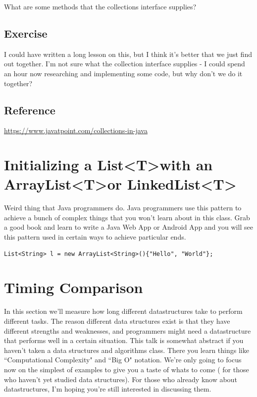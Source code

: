 \documentclass[12pt]{article}
\begin{document}
What are some methods that the  collections interface supplies?

\subsection{Exercise}
I could have written a long lesson on this, but I think it's better that we just find out together. I'm not sure what the collection interface supplies - I could spend an hour now researching and implementing some code, but why don't we do it together?

\subsection{Reference}

\url{https://www.javatpoint.com/collections-in-java}

\section{Initializing a List\textless T\textgreater with an ArrayList\textless T\textgreater or LinkedList\textless T\textgreater}
Weird thing that Java programmers do. Java programmers use this pattern to achieve a bunch of complex things that you won't learn about in this class. Grab a good book and learn to write a Java Web App or Android App and you will see this pattern used in certain ways to achieve particular ends.

\begin{lstlisting}
List<String> l = new ArrayList<String>(){"Hello", "World"};
\end{lstlisting}

\section{Timing Comparison}
In this section we'll measure how long different datastructures take to perform different tasks. The reason different data structures exist is that they have different strengths and weaknesses, and programmers might need a datastructure that performs well in a certain situation. This talk is somewhat abstract if you haven't taken  a data structures and algorithms class. There you learn things like ``Computational Complexity" and ``Big O" notation. We're only going to focus now on the simplest of examples to give you a taste of whats to come ( for those who haven't yet studied data structures). For those who already know about datastructures, I'm hoping you're still interested in discussing them.
\end{document}
